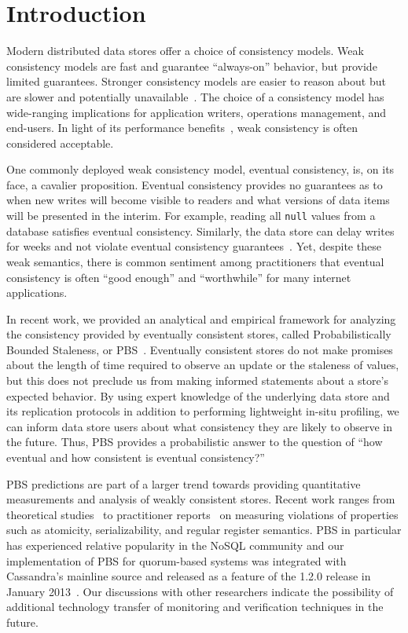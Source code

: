 \section{Introduction}

Modern distributed data stores offer a choice of consistency
models. Weak consistency models are fast and guarantee ``always-on''
behavior, but provide limited guarantees. Stronger consistency models
are easier to reason about but are slower and potentially
unavailable~\cite{davidson-survey}. The choice of a consistency model has
wide-ranging implications for application writers, operations
management, and end-users.  In light of its performance
benefits~\cite{abadi-pacelc}, weak consistency is often considered
acceptable.

One commonly deployed weak consistency model, eventual consistency,
is, on its face, a cavalier proposition. Eventual consistency provides
no guarantees as to when new writes will become visible to readers and
what versions of data items will be presented in the interim. For
example, reading all \texttt{null} values from a database satisfies
eventual consistency. Similarly, the data store can delay writes for
weeks and not violate eventual consistency
guarantees~\cite{vogels-defs}. Yet, despite these weak semantics,
there is common sentiment among practitioners that eventual
consistency is often ``good enough'' and ``worthwhile'' for many
internet applications.

In recent work, we provided an analytical and empirical framework for
analyzing the consistency provided by eventually consistent stores,
called Probabilistically Bounded Staleness, or
PBS~\cite{pbs-vldb2012}. Eventually consistent stores do not make
promises about the length of time required to observe an update or the
staleness of values, but this does not preclude us from making
informed statements about a store's expected behavior. By using expert
knowledge of the underlying data store and its replication protocols
in addition to performing lightweight in-situ profiling, we can inform
data store users about what consistency they are likely to observe in
the future. Thus, PBS provides a probabilistic answer to the question
of ``how eventual and how consistent is eventual consistency?''

PBS predictions are part of a larger trend towards providing
quantitative measurements and analysis of weakly consistent
stores. Recent work ranges from theoretical studies~\cite{podc-hpl} to
practitioner reports~\cite{hotdep} on measuring violations of
properties such as atomicity, serializability, and regular register
semantics. PBS in particular has experienced relative popularity in
the NoSQL community and our implementation of PBS for quorum-based
systems was integrated with Cassandra's mainline source and released
as a feature of the 1.2.0 release in January
2013~\cite{cassandra-pbs-patch}. Our discussions with other
researchers indicate the possibility of additional technology
transfer of monitoring and verification techniques in the future.

